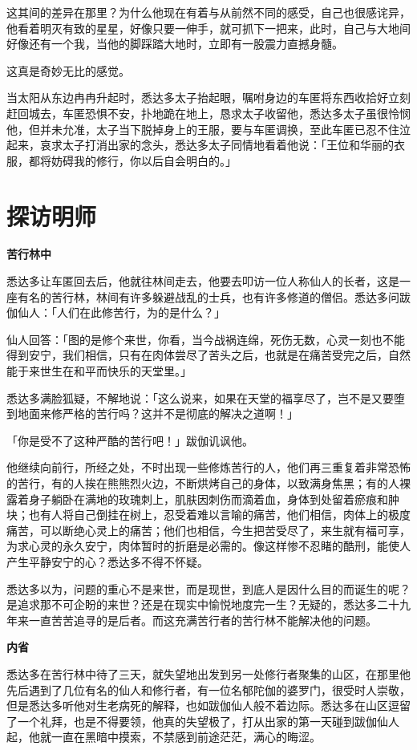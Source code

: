 \documentclass[twoside,openany]{book}
\newcommand{\mt}[1]{\textbullet \textbf{#1}}
\begin{document}
这其间的差异在那里？为什么他现在有着与从前然不同的感受，自己也很感诧异，他看着明灭有致的星星，好像只要一伸手，就可抓下一把来，此时，自己与大地间好像还有一个我，当他的脚踩踏大地时，立即有一股震力直撼身髓。

这真是奇妙无比的感觉。

当太阳从东边冉冉升起时，悉达多太子抬起眼，嘱咐身边的车匿将东西收拾好立刻赶回城去，车匿恐惧不安，扑地跪在地上，恳求太子收留他，悉达多太子虽很怜悯他，但并未允准，太子当下脱掉身上的王服，要与车匿调换，至此车匿已忍不住泣起来，哀求太子打消出家的念头，悉达多太子同情地看着他说：「王位和华丽的衣服，都将妨碍我的修行，你以后自会明白的。」

\section{探访明师}\label{sec1.2}

\mt{苦行林中}

悉达多让车匿回去后，他就往林间走去，他要去叩访一位人称仙人的长者，这是一座有名的苦行林，林间有许多躲避战乱的士兵，也有许多修道的僧侣。悉达多问跋伽仙人：「人们在此修苦行，为的是什么？」

仙人回答：「图的是修个来世，你看，当今战祸连绵，死伤无数，心灵一刻也不能得到安宁，我们相信，只有在肉体尝尽了苦头之后，也就是在痛苦受完之后，自然能于来世生在和平而快乐的天堂里。」

悉达多满脸狐疑，不解地说：「这么说来，如果在天堂的福享尽了，岂不是又要堕到地面来修严格的苦行吗？这并不是彻底的解决之道啊！」

「你是受不了这种严酷的苦行吧！」跋伽讥讽他。

他继续向前行，所经之处，不时出现一些修炼苦行的人，他们再三重复着非常恐怖的苦行，有的人挨在熊熊烈火边，不断烘烤自己的身体，以致满身焦黑；有的人裸露着身子躺卧在满地的玫瑰刺上，肌肤因刺伤而滴着血，身体到处留着瘀痕和肿块；也有人将自己倒挂在树上，忍受着难以言喻的痛苦，他们相信，肉体上的极度痛苦，可以断绝心灵上的痛苦；他们也相信，今生把苦受尽了，来生就有福可享，为求心灵的永久安宁，肉体暂时的折磨是必需的。像这样惨不忍睹的酷刑，能使人产生平静安宁的心？悉达多不得不怀疑。

悉达多以为，问题的重心不是来世，而是现世，到底人是因什么目的而诞生的呢？是追求那不可企盼的来世？还是在现实中愉悦地度完一生？无疑的，悉达多二十九年来一直苦苦追寻的是后者。而这充满苦行者的苦行林不能解决他的问题。

\mt{内省}

悉达多在苦行林中待了三天，就失望地出发到另一处修行者聚集的山区，在那里他先后遇到了几位有名的仙人和修行者，有一位名郁陀伽的婆罗门，很受时人崇敬，但是悉达多听他对生老病死的解释，也如跋伽仙人般不着边际。悉达多在山区逗留了一个礼拜，也是不得要领，他真的失望极了，打从出家的第一天碰到跋伽仙人起，他就一直在黑暗中摸索，不禁感到前途茫茫，满心的晦涩。
\end{document}
